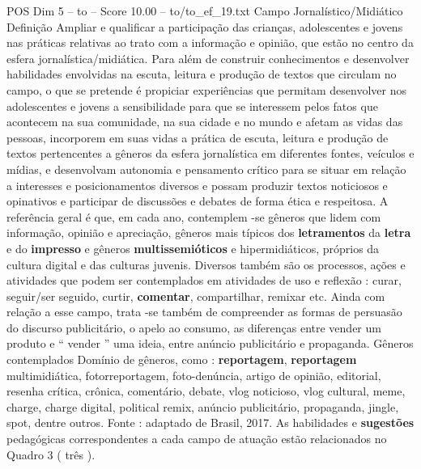 \begin{textsample}{POS Dim 5 – to – Score 10.00 – to/to\_ef\_19.txt}
Campo Jornalístico/Midiático Definição Ampliar e qualificar a participação das crianças, adolescentes e jovens nas práticas relativas ao trato com a informação e opinião, que estão no centro da esfera jornalística/midiática.
Para além de construir conhecimentos e desenvolver habilidades envolvidas na escuta, leitura e produção de textos que circulam no campo, o que se pretende é propiciar experiências que permitam desenvolver nos adolescentes e jovens a sensibilidade para que se interessem pelos fatos que acontecem na sua comunidade, na sua cidade e no mundo e afetam as vidas das pessoas, incorporem em suas vidas a prática de escuta, leitura e produção de textos pertencentes a gêneros da esfera jornalística em diferentes fontes, veículos e mídias, e desenvolvam autonomia e pensamento crítico para se situar em relação a interesses e posicionamentos diversos e possam produzir textos noticiosos e opinativos e participar de discussões e debates de forma ética e respeitosa.
A referência geral é que, em cada ano, contemplem -se gêneros que lidem com informação, opinião e apreciação, gêneros mais típicos dos \textbf{letramentos} da \textbf{letra} e do \textbf{impresso} e gêneros \textbf{multissemióticos} e hipermidiáticos, próprios da cultura digital e das culturas juvenis.
Diversos também são os processos, ações e atividades que podem ser contemplados em atividades de uso e reflexão : curar, seguir/ser seguido, curtir, \textbf{comentar}, compartilhar, remixar etc.
Ainda com relação a esse campo, trata -se também de compreender as formas de persuasão do discurso publicitário, o apelo ao consumo, as diferenças entre vender um produto e “ vender ” uma ideia, entre anúncio publicitário e propaganda.
Gêneros contemplados Domínio de gêneros, como : \textbf{reportagem}, \textbf{reportagem} multimidiática, fotorreportagem, foto-denúncia, artigo de opinião, editorial, resenha crítica, crônica, comentário, debate, vlog noticioso, vlog cultural, meme, charge, charge digital, political remix, anúncio publicitário, propaganda, jingle, spot, dentre outros.
Fonte : adaptado de Brasil, 2017.
As habilidades e \textbf{sugestões} pedagógicas correspondentes a cada campo de atuação estão relacionados no Quadro 3 ( três ).

\end{textsample}
